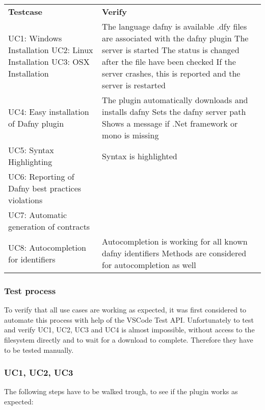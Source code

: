\begin{longtable}{ p{} | p{} }
	\textbf{Testcase} & \textbf{Verify}\\
	UC1: Windows Installation\newline 
	UC2: Linux Installation\newline 
	UC3: OSX Installation & 
		The language dafny is available\newline 
		.dfy files are associated with the dafny plugin\newline
		The server is started\newline
		The status is changed after the file have been checked\newline
		If the server crashes, this is reported and the server is restarted
	\\
	UC4: Easy installation of Dafny plugin & 
		The plugin automatically downloads and installs dafny\newline
		Sets the dafny server path \newline
		Shows a message if .Net framework or mono is missing
	\\
	UC5: Syntax Highlighting & 
		Syntax is highlighted
	\\
	UC6: Reporting of Dafny best practices violations &
		\todo{?}
	
 	\\
	UC7: Automatic generation of contracts & \todo{Invariant: Require and ensures are generated?} \\
	UC8: Autocompletion for identifiers & 
		Autocompletion is working for all known dafny identifiers\newline
		Methods are considered for autocompletion as well
		
	
	\\
\end{longtable}


\subsubsection{Test process}
To verify that all use cases are working as expected, it was first considered to automate this process with help of the VSCode Test API. Unfortunately to test and verify UC1, UC2, UC3 and UC4 is almost impossible, without access to the filesystem directly and to wait for a download to complete. Therefore they have to be tested manually. 
\subsubsection{UC1, UC2, UC3}
The following steps have to be walked trough, to see if the plugin works as expected:

